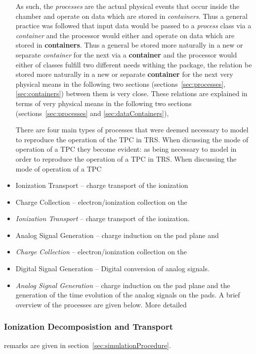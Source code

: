 \documentclass[twoside]{article}
\newcommand{\name}[1]{\textsf{#1}}%
\begin{document}
\begin{itemize}
As such, the {\em processes} are the actual physical events that occur inside the chamber
and operate on data which are stored in {\em containers}.  Thus a general
practice was followed that input data would be passed to a {\em process} class
via a {\em container} and the processor would either
and operate on data which are stored in {\bf containers}.  Thus a general
be stored more naturally in a new or separate {\em container} for the next
via a {\bf container} and the processor would either
of classes fulfill two different needs withing the package, the relation
be stored more naturally in a new or separate {\bf container} for the next
very physical means in the following two sections (sections~\ref{sec:processes},
\ref{sec:containers})
between them is very close.  These relations are explained in terms of
very physical means in the following two sections 
(sections~\ref{sec:processes} and \ref{sec:dataContainers}),

There are four main types of processes that were deemed necessary
to model to reproduce the operation of the TPC in \name{TRS}.
When dicussing the mode of operation of a TPC they become evident:
as being necessary to model in order to reproduce the operation of 
a TPC in \name{TRS}.  When discussing the mode of operation of a TPC 
  \item Ionization Transport -- charge transport of the ionization
  \item Charge Collection -- electron/ionization collection on the
  \item {\em Ionization Transport} -- charge transport of the ionization.
  \item Analog Signal Generation -- charge induction on the pad plane and
  \item {\em Charge Collection} -- electron/ionization collection on the
  \item Digital Signal Generation -- Digital conversion of analog signals.
  \item {\em Analog Signal Generation} -- charge induction on the pad plane and
    the generation of the time evolution of the analog signals on the pads.
A brief overview of the processes are given below.  More detailed
\end{itemize}
\subsubsection{Ionization Decomposistion and Transport}
remarks are given in section~\ref{sec:simulationProcedure}.
\end{document}
